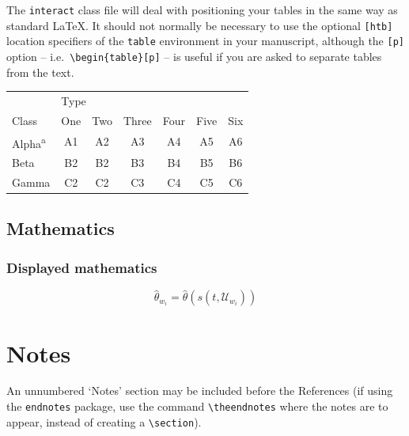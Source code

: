 \documentclass[]{interact}
\theoremstyle{plain}%
\theoremstyle{definition}
\theoremstyle{remark}
\begin{document}
The \texttt{interact} class file will deal with positioning your tables in the same way as standard \LaTeX. It should not normally be necessary to use the optional \texttt{[htb]} location specifiers of the \texttt{table} environment in your manuscript, although the \texttt{[p]} option -- i.e.\ \verb"\begin{table}[p]" -- is useful if you are asked to separate tables from the text.

\begin{table}[h]
{\begin{tabular}{lcccccc} \toprule
 & \multicolumn{2}{l}{Type} \\ \cmidrule{2-7}
 Class & One & Two & Three & Four & Five & Six \\ \midrule
 Alpha\textsuperscript{a} & A1 & A2 & A3 & A4 & A5 & A6 \\
 Beta & B2 & B2 & B3 & B4 & B5 & B6 \\
 Gamma & C2 & C2 & C3 & C4 & C5 & C6 \\ \bottomrule
\end{tabular}}
\label{sample-table}
\end{table}


\subsection{Mathematics}

\subsubsection{Displayed mathematics}


\begin{equation}
 \hat{\theta}_{w_i} = \hat{\theta}(s(t,\mathcal{U}_{w_i}))
\end{equation}


\section*{Notes}

An unnumbered `Notes' section may be included before the References (if using the \verb"endnotes" package, use the command \verb"\theendnotes" where the notes are to appear, instead of creating a \verb"\section").
\end{document}

